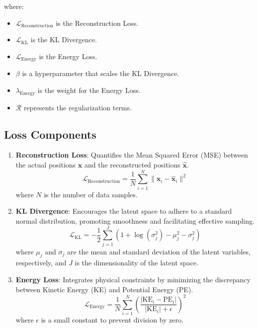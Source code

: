\documentclass[12pt]{article}
\begin{document}
where:
\begin{itemize}
    \item \( \mathcal{L}_{\text{Reconstruction}} \) is the Reconstruction Loss.
    \item \( \mathcal{L}_{\text{KL}} \) is the KL Divergence.
    \item \( \mathcal{L}_{\text{Energy}} \) is the Energy Loss.
    \item \( \beta \) is a hyperparameter that scales the KL Divergence.
    \item \( \lambda_{\text{Energy}} \) is the weight for the Energy Loss.
    \item \( \mathcal{R} \) represents the regularization terms.
\end{itemize}

\subsection{Loss Components}

\begin{enumerate}[label=\alph*.]
    \item \textbf{Reconstruction Loss}: Quantifies the Mean Squared Error (MSE) between the actual positions \( \mathbf{x} \) and the reconstructed positions \( \hat{\mathbf{x}} \).
    \[
    \mathcal{L}_{\text{Reconstruction}} = \frac{1}{N} \sum_{i=1}^{N} \| \mathbf{x}_i - \hat{\mathbf{x}}_i \|^2
    \]
    where \( N \) is the number of data samples.

    \item \textbf{KL Divergence}: Encourages the latent space to adhere to a standard normal distribution, promoting smoothness and facilitating effective sampling.
    \[
    \mathcal{L}_{\text{KL}} = -\frac{1}{2} \sum_{j=1}^{J} \left(1 + \log(\sigma_j^2) - \mu_j^2 - \sigma_j^2 \right)
    \]
    where \( \mu_j \) and \( \sigma_j \) are the mean and standard deviation of the latent variables, respectively, and \( J \) is the dimensionality of the latent space.

    \item \textbf{Energy Loss}: Integrates physical constraints by minimizing the discrepancy between Kinetic Energy (KE) and Potential Energy (PE).
    \[
    \mathcal{L}_{\text{Energy}} = \frac{1}{N} \sum_{i=1}^{N} \left( \frac{|\text{KE}_i - \text{PE}_i|}{|\text{KE}_i| + \epsilon} \right)^2
    \]
    where \( \epsilon \) is a small constant to prevent division by zero.

\end{enumerate}
\end{document}
